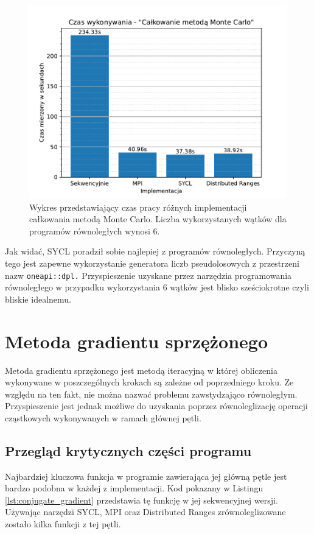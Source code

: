 \documentclass[a4paper,12pt]{book} %
\begin{document}
\begin{figure}
	\centering
	\includegraphics[scale=1]{assets/czas_wykonania_calkowanie.pdf}
	\caption{Wykres przedstawiający czas pracy różnych implementacji całkowania metodą Monte Carlo. Liczba wykorzystanych wątków dla programów równoległych wynosi 6.}
	\label{fig:wykonanie-MC}
\end{figure}

Jak widać, SYCL poradził sobie najlepiej z programów równoległych. Przyczyną tego jest zapewne wykorzystanie generatora liczb pseudolosowych z przestrzeni nazw \texttt{oneapi::dpl.} Przyspieszenie uzyskane przez narzędzia programowania równoległego w przypadku wykorzystania 6 wątków jest blisko sześciokrotne czyli bliskie idealnemu.

\section{Metoda gradientu sprzężonego}
Metoda gradientu sprzężonego jest metodą iteracyjną w której obliczenia wykonywane w poszczególnych krokach są zależne od poprzedniego kroku. Ze względu na ten fakt, nie można nazwać problemu zawstydzająco równoległym. Przyspieszenie jest jednak możliwe do uzyskania poprzez równoleglizację operacji cząstkowych wykonywanych w ramach głównej pętli.

\subsection{Przegląd krytycznych części programu}
Najbardziej kluczowa funkcja w programie zawierająca jej główną pętle jest bardzo podobna w każdej z implementacji. Kod pokazany w Listingu \ref{lst:conjugate_gradient} przedstawia tę funkcję w jej sekwencyjnej wersji. Używając narzędzi SYCL, MPI oraz Distributed Ranges zrównoleglizowane zostało kilka funkcji z tej pętli.
\end{document}
